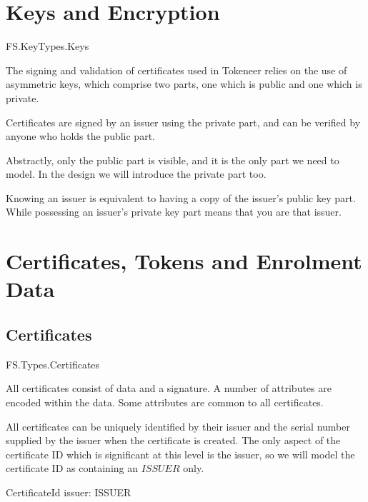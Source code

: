 \section{Keys and Encryption}

\begin{traceunit}{FS.KeyTypes.Keys}
\end{traceunit}

The signing and validation of certificates used in Tokeneer relies on
the use of
asymmetric keys, which comprise two parts, one which is public and
one which is private. 
\begin{zed}
        [ KEYPART ]
\end{zed}

Certificates are signed by an issuer using the private part, and can
be verified by anyone who holds the public part. 

Abstractly, only the public part is visible,
and it is the only part we need to model. In the design we will
introduce the private part too.

Knowing an issuer is equivalent to having a copy of the issuer's
public key part. While possessing an issuer's private key part means 
that you are that issuer.
\section{Certificates, Tokens and Enrolment Data} 
\subsection{Certificates}

\begin{traceunit}{FS.Types.Certificates}
\end{traceunit}

All certificates consist of data and a signature. A number of
attributes are encoded within the data. Some attributes are common to
all certificates. 

All certificates can be uniquely identified by their issuer and the
serial number supplied by the issuer when the certificate is created.
The only aspect of the certificate ID which is significant at this 
level is the issuer, so we will model the certificate ID as containing
an $ISSUER$ only.
\begin{schema}{CertificateId}
	issuer: ISSUER
\end{schema}

